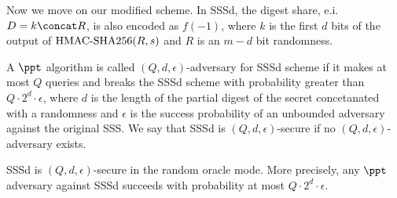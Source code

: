 \documentclass[envcountsame,runningheads,notitlepage]{llncs}
\begin{document}
	
	Now we move on our modified scheme. 	
	In SSSd, the digest share, e.i. $D = k \concat R$, is also encoded as $f(-1)$, where  $k$ is the first $d$ bits of the output of ${\textrm{HMAC-SHA256}}(R, s)$ and $R$ is an $m - d$ bit randomness. 
	\begin{definition}
		A $\ppt$ algorithm is called $(Q, d, \epsilon)$-adversary for SSSd scheme if it makes at most $Q$ queries and breaks the SSSd scheme with probability greater than $Q \cdot 2^{d} \cdot \epsilon$, where $d$ is the length of the partial digest of the secret concetanated with a randomness and $\epsilon$ is the success probability of an unbounded adversary against the original SSS. We say that SSSd is $(Q, d, \epsilon)$-secure if no $(Q, d, \epsilon)$-adversary exists. 
	\end{definition}
	
	\begin{theorem}
		SSSd is $(Q, d, \epsilon)$-secure in  the random oracle mode.
		More precisely, any $\ppt$ adversary against SSSd succeeds with probability at most $Q \cdot 2^{d} \cdot \epsilon$.   
	\end{theorem}
	
\end{document}
